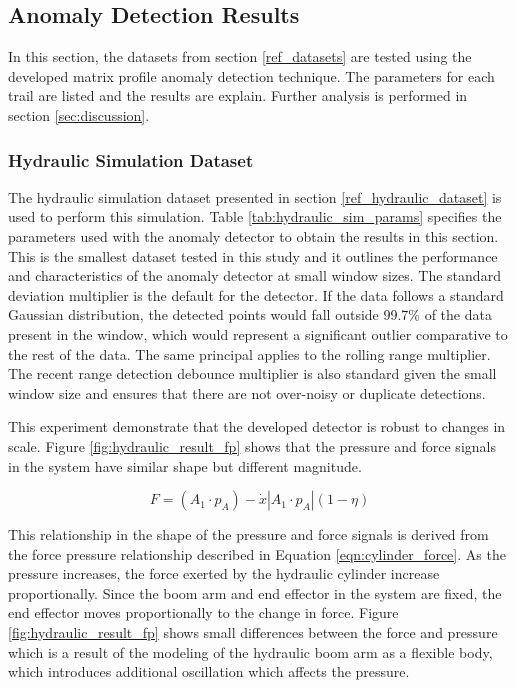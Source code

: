 \subsection{Anomaly Detection Results}

In this section, the datasets from section \ref{ref_datasets} are tested using the developed matrix profile anomaly detection technique. The parameters for each trail are listed and the results are explain. Further analysis is performed in section \ref{sec:discussion}.

\subsubsection{Hydraulic Simulation Dataset}
\label{ref_results_hydraulic_sim}
The hydraulic simulation dataset presented in section \ref{ref_hydraulic_dataset} is used to perform this simulation. Table \ref{tab:hydraulic_sim_params} specifies the parameters used with the anomaly detector to obtain the results in this section. This is the smallest dataset tested in this study and it outlines the performance and characteristics of the anomaly detector at small window sizes. The standard deviation multiplier is the default for the detector. If the data follows a standard Gaussian distribution, the detected points would fall outside 99.7\% of the data present in the window, which would represent a significant outlier comparative to the rest of the data. The same principal applies to the rolling range multiplier. The recent range detection debounce multiplier is also standard given the small window size and ensures that there are not over-noisy or duplicate detections.

This experiment demonstrate that the developed detector is robust to changes in scale. Figure \ref{fig:hydraulic_result_fp} shows that the pressure and force signals in the system have similar shape but different magnitude. 

\begin{equation}
    \label{eqn:cylinder_force}
    F = (A_1 \cdot p_A) - \dot{x}  | A_1 \cdot p_A | (1 - \eta)
\end{equation}

This relationship in the shape of the pressure and force signals is derived from the force pressure relationship described in Equation \ref{eqn:cylinder_force}. As the pressure increases, the force exerted by the hydraulic cylinder increase proportionally. Since the boom arm and end effector in the system are fixed, the end effector moves proportionally to the change in force. Figure \ref{fig:hydraulic_result_fp} shows small differences between the force and pressure which is a result of the modeling of the hydraulic boom arm as a flexible body, which introduces additional oscillation which affects the pressure.

